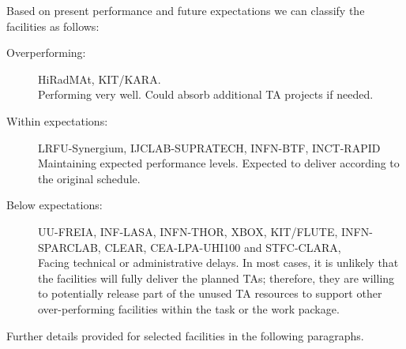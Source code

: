 {Based on present performance and future expectations we can classify the facilities as follows:
\begin{description}
    \item[Overperforming:] HiRadMAt, KIT/KARA. \\
        Performing very well. Could absorb additional TA projects if needed.
    \item[Within expectations:] LRFU-Synergium, IJCLAB-SUPRATECH, INFN-BTF, INCT-RAPID \\
        Maintaining expected performance levels. Expected to deliver according to the original schedule. 
    \item[Below expectations:] UU-FREIA, INF-LASA, INFN-THOR, XBOX, KIT/FLUTE, INFN-SPARCLAB, CLEAR, CEA-LPA-UHI100 and STFC-CLARA,  \\
        Facing technical or administrative delays. In most cases, it is unlikely that the facilities will fully deliver the planned TAs; therefore, they are willing to potentially release part of the unused TA resources to support other over-performing facilities within the task or the work package.
\end{description}
Further details provided for selected facilities in the following paragraphs.

    
}
